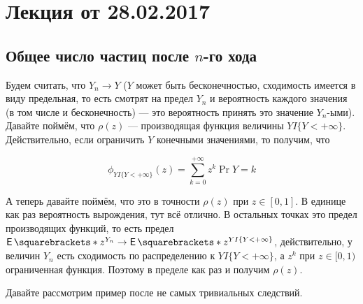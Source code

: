 \section{Лекция от 28.02.2017}

\renewcommand{\labelitemii}{$\bullet$}

\subsection{Общее число частиц после $n$-го хода}

Будем считать, что $Y_n \to Y$ ($Y$ может быть бесконечностью, сходимость
имеется в виду предельная, то есть смотрят на предел $Y_n$ и вероятность каждого значения 
(в том числе и бесконечность) --- это вероятность принять это значение $Y_n$-ыми).
Давайте
поймём, что $\rho(z)$ --- производящая функция величины $YI\{Y < +\infty\}$. 
Действительно, если ограничить $Y$ конечными значениями, то получим, что

\[
  \phi_{YI\{Y < +\infty\}}(z) = \sum\limits_{k = 0}^{+\infty} z^k \Pr{Y = k}
\]

А теперь давайте поймём, что это в точности $\rho(z)$ при $z \in [0, 1]$.
В единице как раз вероятность вырождения, тут всё отлично. В остальных точках
это предел производящих функций, то есть предел $\E{z^{Y_n}} \to \E{z^{Y I\{Y < +\infty\}}}$,
действительно, у величин $Y_n$ есть сходимость по распределению
к $Y I\{Y < +\infty\}$, а $z^k$ при $z \in [0, 1)$ ограниченная функция. Поэтому
в пределе как раз и получим $\rho(z)$.

Давайте рассмотрим пример после не самых тривиальных следствий.


